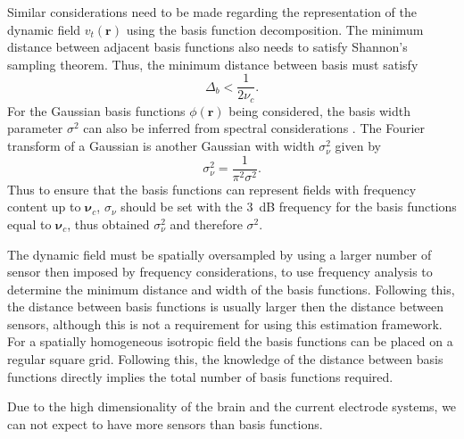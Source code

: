 \documentclass[12pt]{iopart}		%
\begin{document}
Similar considerations need to be made regarding the representation of the dynamic field $v_t(\mathbf{r})$ using the basis function decomposition. The minimum distance between adjacent basis functions also needs to satisfy Shannon's sampling theorem. Thus, the minimum distance between basis must satisfy
\begin{equation}
\Delta_b < \frac{1}{2\nu_c}.
\end{equation}
For the Gaussian basis functions $\phi(\mathbf{r})$ being considered, the basis width parameter $\sigma^2$ can also be inferred from spectral considerations \cite{Sanner1992,Scerri2009}. The Fourier transform of a Gaussian is another Gaussian with width $\sigma^2_{\nu}$ given by
\begin{equation}
\sigma^2_{\nu} = \frac{1}{\pi^2\sigma^2}.
\end{equation}
Thus to ensure that the basis functions can represent fields with frequency content up to $\boldsymbol{\nu}_c$, $\sigma_{\nu}$ should be set with the 3~dB frequency for the basis functions equal to $\boldsymbol{\nu}_c$, thus obtained $\sigma^2_{\nu}$ and therefore $\sigma^2$.

The dynamic field must be spatially oversampled by using a larger number of sensor then imposed by frequency considerations, to use frequency analysis to determine the minimum distance and width of the basis functions. Following this, the distance between basis functions is usually larger then the distance between sensors, although this is not a requirement for using this estimation framework. For a spatially homogeneous isotropic field the basis functions can be placed on a regular square grid. Following this, the knowledge of the distance between basis functions directly implies the total number of basis functions required.

Due to the high dimensionality of the brain and the current electrode systems, we can not expect to have more sensors than basis functions.
\end{document}
